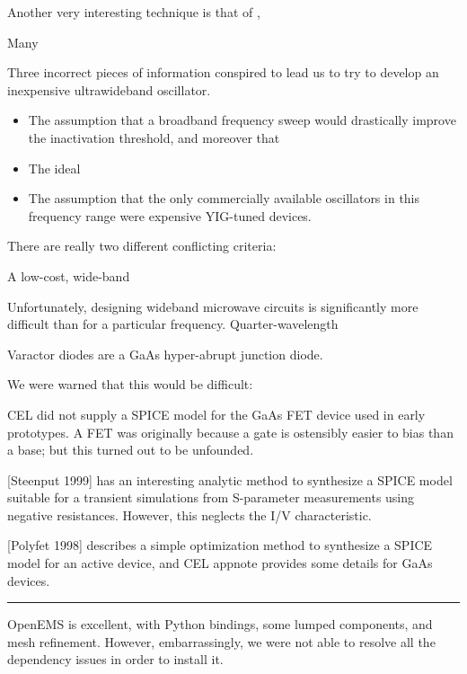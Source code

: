 \documentclass[paper.tex]{subfiles}
\begin{document}
Another very interesting technique is that of \cite{Study2003}, 




Many 

Three incorrect pieces of information conspired to lead us to try to develop an inexpensive ultrawideband oscillator.

\begin{itemize}
	\item The assumption that a broadband frequency sweep would drastically improve the inactivation threshold, and moreover that 
	\item The ideal 
	\item The assumption that the only commercially available oscillators in this frequency range were expensive YIG-tuned devices.
\end{itemize}

There are really two different conflicting criteria: 

A low-cost, wide-band

Unfortunately, designing wideband microwave circuits is significantly more difficult than for a particular frequency. Quarter-wavelength 

Varactor diodes are a GaAs hyper-abrupt junction diode.

We were warned that this would be difficult: 



CEL did not supply a SPICE model for the GaAs FET device used in early prototypes. A FET was originally because a gate is ostensibly easier to bias than a base; but this turned out to be unfounded.

[Steenput 1999] has an interesting analytic method to synthesize a SPICE model suitable for a transient simulations from S-parameter measurements using negative resistances. However, this neglects the I/V characteristic. 

[Polyfet 1998] describes a simple optimization method to synthesize a SPICE model for an active device, and CEL appnote provides some details for GaAs devices.



\rule{\linewidth}{0.2pt}

OpenEMS is excellent, with Python bindings, some lumped components, and mesh refinement. However, embarrassingly, we were not able to resolve all the dependency issues in order to install it.
\end{document}
